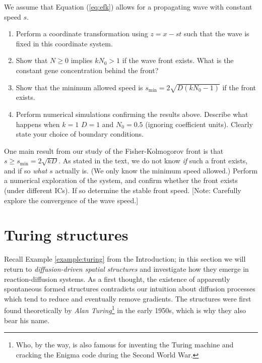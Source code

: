 \begin{exerciseregion}
\begin{exercise}
	  We assume that Equation (\ref{eq:efk}) allows for a propagating wave with constant speed $s$. 
	  \begin{enumerate}
	  \item Perform a coordinate transformation using $z=x-st$ such that the
		wave is fixed in this coordinate system.
	  \item Show that $N \geq 0$ implies $kN_0 > 1$ if the wave front
		exists. What is the constant gene concentration behind the front?
	  \item Show that the minimum allowed speed is 
		$s_{\text{min}}=2\sqrt{D(kN_0-1)}$ if the front exists.
	  \item Perform numerical simulations confirming the results
		above. Describe what happens when $k=1$ $D=1$ and $N_0=0.5$
		(ignoring coefficient units). Clearly state your choice of boundary
		conditions.
	  \end{enumerate}
	\end{exercise}

	\begin{exploration}
		\label{exploration:fisherKol}
		One main result from our study of the Fisher-Kolmogorov front is that
		$s \geq s_\text{min} = 2\sqrt{kD}$. As stated in the text, we do not know
		\emph{if} such a front exists, and if so \emph{what} $s$ actually is. (We only
		know the minimum speed allowed.) Perform a numerical exploration of the
		system, and confirm whether the front exists (under different ICs). If so
		determine the stable front speed. [Note: Carefully explore the convergence of
		the wave speed.]
	\end{exploration}


\end{exerciseregion}


\section{Turing structures}
Recall Example \ref{example:turing} from the Introduction; 
in this section we will return to \emph{diffusion-driven spatial structures} and investigate how
they emerge in reaction-diffusion systems. As a first thought, the existence of apparently spontaneous 
formed structures contradicts our intuition about diffusion processes which tend to reduce and eventually remove gradients.  
The structures were first found theoretically by 
\emph{Alan Turing}\footnote{Who, by the way, is also famous for inventing the Turing machine and
cracking the Enigma code during the Second World War.} in the early 1950s, which is why they also
bear his name. 

